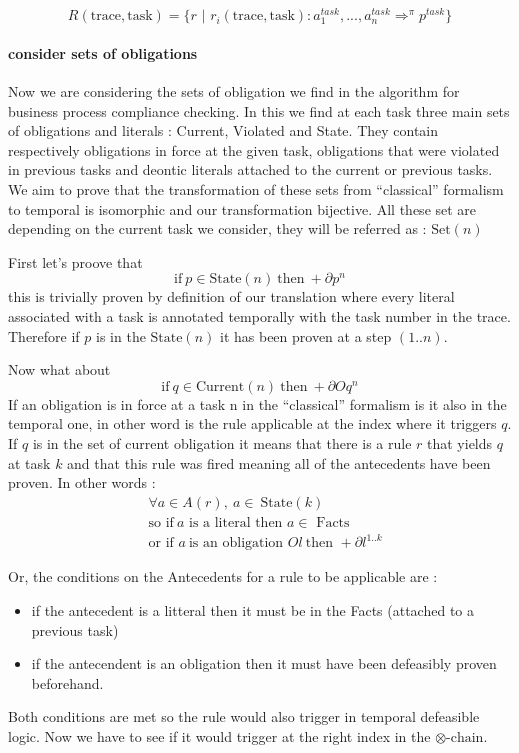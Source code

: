 \documentclass[10pt]{report}
\newcommand{\ochain}{$\otimes \text{-chain}$}
\begin{document}
\[ R(\text{trace}, \text{task}) = \{r\text{ | }r_{i} (\text{trace}, \text{task}) : a_{1}^{task}, ..., a_{n}^{task} \Rightarrow^{\pi} p^{task} \}\]

\paragraph{consider sets of obligations}
Now we are considering the sets of obligation we find in the algorithm for business process compliance checking. In this we find at each task three main sets of obligations and literals : Current, Violated and State. They contain respectively obligations in force at the given task, obligations that were violated in previous tasks and deontic literals attached to the current or previous tasks. We aim to prove that the transformation of these sets from \enquote{classical} formalism to temporal is isomorphic and our transformation bijective. All these set are depending on the current task we consider, they will be referred as : $\text{Set}(n)$

First let's proove that $$\text{if}\ p \in \text{State}(n)\ \text{then}\ +\partial p^{n} $$
this is trivially proven by definition of our translation where every literal associated with a task is annotated temporally with the task number in the trace. Therefore if $p$ is in the $\text{State}(n)$ it has been proven at a step $(1..n)$.

Now what about $$\text{if}\ q \in \text{Current}(n)\ \text{then}\ +\partial Oq^{n} $$
If an obligation is in force at a task n in the \enquote{classical} formalism is it also in the temporal one, in other word is the rule applicable at the index where it triggers $q$. If $q$ is in the set of current obligation it means that there is a rule $r$ that yields $q$ at task $k$ and that this rule was fired meaning all of the antecedents have been proven. In other words :
\begin{align*}
&\forall a \in A(r),\ a \in\ \text{State}(k) \\
& \text{so if}\ a \text{ is a literal then }   a \in \text{ Facts} \\
& \text{or if } a\ \text{is an obligation } Ol\ \text{then } +\partial l^{1..k} 
\end{align*} 

Or, the conditions on the Antecedents for a rule to be applicable are :
\begin{itemize}
\item if the antecedent is a litteral then it must be in the Facts (attached to a previous task)
\item if the antecendent is an obligation then it must have been defeasibly proven beforehand.
\end{itemize}
Both conditions are met so the rule would also trigger in temporal defeasible logic. Now we have to see if it would trigger at the right index in the \ochain.
\end{document}
